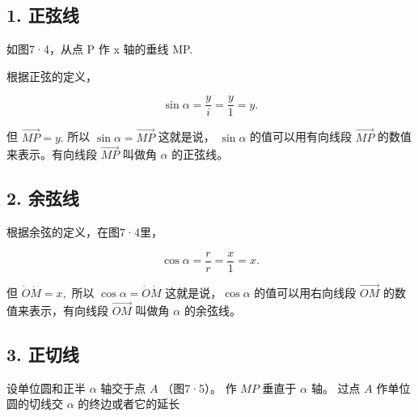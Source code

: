 \subsection{1. 正弦线}

如图7·4，从点 P 作 x 轴的垂线 MP.

根据正弦的定义，

\[
\sin \alpha = \frac {y}{i} = \frac {y}{1} = y.
\]

但 \(\overrightarrow{MP} = y.\) 所以
\(\sin \alpha = \overrightarrow{MP}\) 这就是说， \(\sin\alpha\)
的值可以用有向线段 \(\overrightarrow{MP}\) 的数值来表示。有向线段
\(\overrightarrow{MP}\) 叫做角 \(\alpha\) 的正弦线。

\subsection{2. 余弦线}

根据余弦的定义，在图7·4里，

\[
\cos \alpha = \frac {r}{r} = \frac {x}{1} = x.
\]

但 \(\dot{O}\dot{M} = x,\) 所以 \(\cos\alpha=\dot{O}\dot{M}\)
这就是说，\(\cos \alpha\) 的值可以用右向线段 \(\overrightarrow{OM}\)
的数值来表示，有向线段 \(\overrightarrow{OM}\) 叫做角 \(\alpha\)
的余弦线。

\subsection{3. 正切线}

设单位圆和正半 \(\alpha\) 轴交于点 \(A\) （图7·5）。 作 \(MP\) 垂直于
\(\alpha\) 轴。 过点 \(A\) 作单位圆的切线交 \(\alpha\)
的终边或者它的延长

